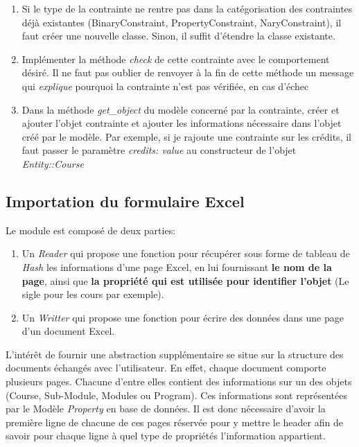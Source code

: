 \begin{enumerate}
  \item Si le type de la contrainte ne rentre pas dans la catégorisation des contraintes déjà existantes (BinaryConstraint, PropertyConstraint, NaryConstraint), il faut créer une nouvelle classe. Sinon, il suffit d'étendre la classe existante.
  \item Implémenter la méthode \textit{check} de cette contrainte avec le comportement désiré. Il ne faut pas oublier de renvoyer à la fin de cette méthode un message qui \textit{explique} pourquoi la contrainte n'est pas vérifiée, en cas d'échec
  \item Dans la méthode \textit{get\_object} du modèle concerné par la contrainte, créer et ajouter l'objet contrainte et ajouter les informations nécessaire dans l'objet créé par le modèle. Par exemple, si je rajoute une contrainte sur les crédits, il faut passer le paramètre \textit{credits: value} au constructeur de l'objet \textit{Entity::Course}
\end{enumerate}



\subsection{Importation du formulaire Excel}
Le module est composé de deux parties: 
\begin{enumerate}
\item Un \textit{Reader} qui propose une fonction pour récupérer sous forme de tableau de \textit{Hash} les informations d'une page Excel, en lui fournissant \textbf{le nom de la page}, ainsi que \textbf{la propriété qui est utilisée pour identifier l'objet} (Le sigle pour les cours par exemple).
\item Un \textit{Writter} qui propose une fonction pour écrire des données dans une page d'un document Excel.
\end{enumerate}

L'intérêt de fournir une abstraction supplémentaire se situe sur la structure des documents échangés avec l'utilisateur. En effet, chaque document comporte plusieurs pages. Chacune d'entre elles contient des informations sur un des objets (Course, Sub-Module, Modules ou Program). Ces informations sont représentées par le Modèle \textit{Property} en base de données. Il est donc nécessaire d'avoir la première ligne de chacune de ces pages réservée pour y mettre le header afin de savoir pour chaque ligne à quel type de propriétés l'information appartient.

